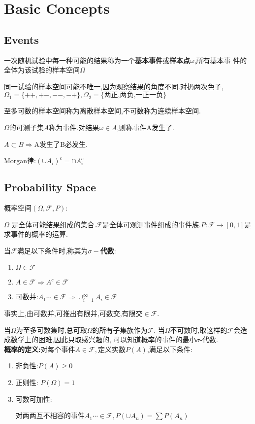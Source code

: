
\section{Basic Concepts}
\subsection{Events}
一次随机试验中每一种可能的结果称为一个{\bf 基本事件}或{\bf 样本点$ \omega$},所有基本事
件的全体为该试验的样本空间$ \Omega$

同一试验的样本空间可能不唯一,因为观察结果的角度不同.对扔两次色子,$ \Omega_1 =
\{++,+-,--,-+\}, \Omega_2 = \{\texttt{两正,两负,一正一负}\}$

至多可数的样本空间称为离散样本空间,不可数称为连续样本空间.

$ \Omega$的可测子集$ A$称为事件.对结果$ \omega \in A$,则称事件A发生了.

$ A \subset B \Rightarrow $A发生了B必发生.

Morgan律:$ (\cup A_i)^c = \cap A_i^c$

\subsection{Probability Space}

概率空间$ (\Omega, \mathcal{F}, P)$:

$\Omega$ 是全体可能结果组成的集合.$ \mathcal{F}$是全体可观测事件组成的事件族.$ P:\mathcal{F} \rightarrow [0,1]$是求事件的概率的运算.

当$ \mathcal{F}$满足以下条件时,称其为{\bf $ \sigma -$代数}:
\begin{enumerate}
	\item $ \Omega \in \mathcal{F}$
	\item $ A\in \mathcal{F} \Rightarrow A^c \in \mathcal{F}$
	\item 可数并:$ A_1 \cdots \in \mathcal{F} \Rightarrow  \cup_{i = 1}^{\infty}{A_i}
		\in \mathcal{F}$
\end{enumerate}
事实上,由可数并,可推出有限并,可数交,有限交$ \in \mathcal{F}$.

当$ \Omega$为至多可数集时,总可取$ \Omega$的所有子集族作为$ \mathcal{F}$.
当$ \Omega$不可数时,取这样的$ \mathcal{F}$会造成数学上的困难,因此只取感兴趣的,
可以知道概率的事件的最小$ \sigma$-代数.
\\

{\bf 概率的定义:}对每个事件$ A\in \mathcal{F},$定义实数$ P(A)$,满足以下条件:
\begin{enumerate}
	\item 非负性:$ P(A) \ge 0$
	\item 正则性: $ P(\Omega) = 1$
	\item 可数可加性:

		对两两互不相容的事件$ A_1 \cdots \in \mathcal{F}, P(\cup{A_n}) =
		\sum{P(A_n)}$
\end{enumerate}


